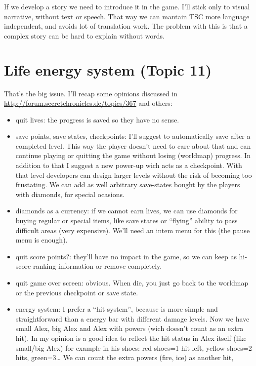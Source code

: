 \documentclass{gd-document}
\begin{document}
If we develop a story we need to introduce it in the game. I’ll stick
only to visual narrative, without text or speech. That way we can
mantain TSC more language independent, and avoids lot of translation
work. The problem with this is that a complex story can be hard to
explain without words.

\section{Life energy system (Topic 11)}

That’s the big issue. I’ll recap some opinions discussed in
\url{http://forum.secretchronicles.de/topics/367} and others:

\begin{itemize}
\item quit lives: the progress is saved so they have no sense.
\item save points, save states, checkpoints: I’ll suggest to
  automatically save after a completed level. This way the player
  doesn’t need to care about that and can continue playing or quitting
  the game without losing (worldmap) progress. In addition to that I
  suggest a new power-up wich acts as a checkpoint. With that level
  developers can design larger levels without the risk of becoming too
  frustating. We can add as well arbitrary save-states bought by the
  players with diamonds, for special ocasions.
\item diamonds as a currency: if we cannot earn lives, we can use
  diamonds for buying regular or special items, like save states or
  “flying” ability to pass difficult areas (very expensive). We’ll
  need an intem menu for this (the pause menu is enough).
\item quit score points?: they’ll have no impact in the game, so we
  can keep as hi-score ranking information or remove completely.
\item quit game over screen: obvious. When die, you just go back to
  the worldmap or the previous checkpoint or save state.
\item energy system: I prefer a “hit system”, because is more simple
  and straightforward than a energy bar with different damage
  levels. Now we have small Alex, big Alex and Alex with powers (wich
  doesn’t count as an extra hit). In my opinion is a good idea to
  reflect the hit status in Alex itself (like small/big Alex) for
  example in his shoes: red shoes=1 hit left, yellow shoes=2 hits,
  green=3… We can count the extra powers (fire, ice) as another hit,

\end{itemize}
\end{document}
